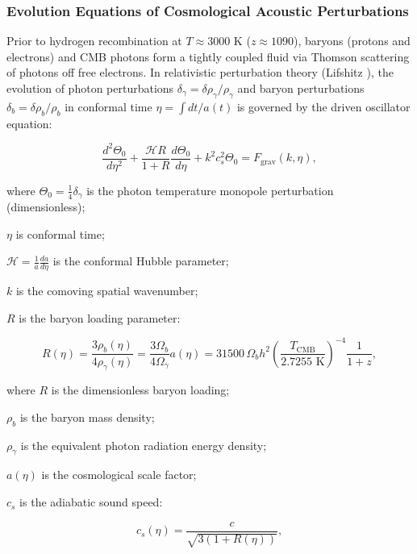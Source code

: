 \documentclass[11pt,a4paper]{article}
\theoremstyle{definition}
\begin{document}
\subsubsection{Evolution Equations of Cosmological Acoustic Perturbations}\label{sec:4.4.2}

Prior to hydrogen recombination at $T \approx 3000\text{ K}$ ($z \approx 1090$), baryons (protons and electrons) and CMB photons form a tightly coupled fluid via Thomson scattering of photons off free electrons. In relativistic perturbation theory (Lifshitz \cite{ref33}), the evolution of photon perturbations $\delta_\gamma = \delta \rho_\gamma / \rho_\gamma$ and baryon perturbations $\delta_b = \delta \rho_b / \rho_b$ in conformal time $\eta = \int dt / a(t)$ is governed by the driven oscillator equation:

\begin{equation}\label{eq:4.41}\tag{4.41}
\frac{d^2 \Theta_0}{d\eta^2} + \frac{\mathcal{H} R}{1+R} \frac{d\Theta_0}{d\eta} + k^2 c_s^2 \Theta_0 = F_{\text{grav}}(k, \eta),
\end{equation}

where $\Theta_0 = \frac{1}{4}\delta_\gamma$ is the photon temperature monopole perturbation (dimensionless);  

$\eta$ is conformal time;  

$\mathcal{H} = \frac{1}{a} \frac{da}{d\eta}$ is the conformal Hubble parameter;  

$k$ is the comoving spatial wavenumber;  

$R$ is the baryon loading parameter:

\begin{equation}\label{eq:4.42}\tag{4.42}
R(\eta) = \frac{3 \rho_b(\eta)}{4 \rho_\gamma(\eta)} = \frac{3 \Omega_b}{4 \Omega_\gamma} a(\eta) = 31500\,\Omega_b h^2 \left( \frac{T_{\text{CMB}}}{2.7255\text{ K}} \right)^{-4} \frac{1}{1+z},
\end{equation}

where $R$ is the dimensionless baryon loading;  

$\rho_b$ is the baryon mass density;  

$\rho_\gamma$ is the equivalent photon radiation energy density;  

$a(\eta)$ is the cosmological scale factor;  

$c_s$ is the adiabatic sound speed:

\begin{equation}\label{eq:4.43}\tag{4.43}
c_s(\eta) = \frac{c}{\sqrt{3 (1 + R(\eta))}},
\end{equation}
\end{document}
